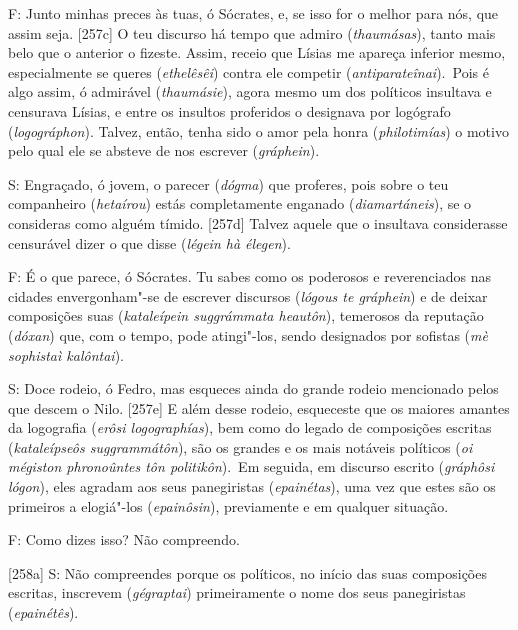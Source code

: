  

F: Junto minhas preces às tuas, ó Sócrates, e, se isso for o melhor para
nós, que assim seja. [257c] O teu discurso há tempo que admiro
(\emph{thaumásas}), tanto mais belo que o anterior o fizeste. Assim,
receio que Lísias me apareça inferior mesmo, especialmente se queres
(\emph{ethelêsêi}) contra ele competir (\emph{antiparateînai}).~Pois é
algo assim, ó admirável (\emph{thaumásie}), agora mesmo um dos políticos
insultava e censurava Lísias, e entre os insultos proferidos o designava
por logógrafo (\emph{logográphon}). Talvez, então, tenha sido o amor
pela honra (\emph{philotimías}) o motivo pelo qual ele se absteve de nos
escrever (\emph{gráphein}).

 

S: Engraçado, ó jovem, o parecer (\emph{dógma}) que proferes, pois sobre
o teu companheiro (\emph{hetaírou}) estás completamente enganado
(\emph{diamartáneis}), se o consideras como alguém tímido. [257d]
Talvez aquele que o insultava considerasse censurável dizer o que disse
(\emph{légein hà élegen}).

 

F: É o que parece, ó Sócrates. Tu sabes como os poderosos e
reverenciados nas cidades envergonham"-se de escrever discursos
(\emph{lógous te gráphein}) e de deixar composições suas
(\emph{kataleípein suggrámmata heautôn}), temerosos da reputação
(\emph{dóxan}) que, com o tempo, pode atingi"-los, sendo designados por
sofistas (\emph{mè sophistaì kalôntai}).

 

S: Doce rodeio, ó Fedro, mas esqueces ainda do grande rodeio mencionado
pelos que descem o Nilo. [257e] E além desse rodeio, esqueceste que
os maiores amantes da logografia (\emph{erôsi logographías}), bem como
do legado de composições escritas (\emph{kataleípseôs suggrammátôn}),
são os grandes e os mais notáveis políticos (\emph{oi mégiston
phronoûntes tôn politikôn}).~Em seguida, em discurso escrito
(\emph{gráphôsi lógon}), eles agradam aos seus panegiristas
(\emph{epainétas}), uma vez que estes são os primeiros a elogiá"-los
(\emph{epainôsin}), previamente e em qualquer situação.

 

F: Como dizes isso? Não compreendo.

 

[258a] S: Não compreendes porque os políticos, no início das suas
composições escritas, inscrevem (\emph{gégraptai}) primeiramente o nome
dos seus panegiristas (\emph{epainétês}).

